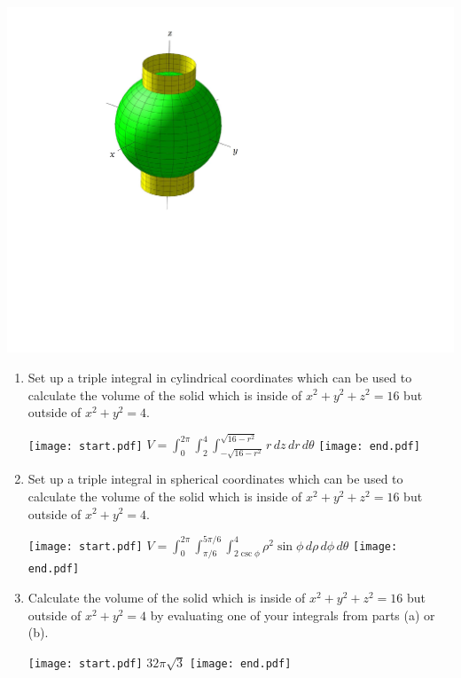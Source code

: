 \documentclass[12pt]{article}
\begin{document}
\begin{enumerate}
\begin{center}
\includegraphics[scale=0.5]{earth.pdf}
\end{center}

\begin{enumerate}

\item Set up a triple integral in cylindrical coordinates which can be used to calculate the volume of the solid which is inside of $x^2+y^2+z^2=16$ but outside of $x^2+y^2=4$.

\texttt{[image: start.pdf]}
{{$V=\int_0^{2\pi} \int_2^4 \int_{-\sqrt{16-r^2}}^{\sqrt{16-r^2}} r \,dz\,dr\,d\theta$}}
\texttt{[image: end.pdf]}


\item Set up a triple integral in spherical coordinates which can be used to calculate the volume of the solid which is inside of $x^2+y^2+z^2=16$ but outside of $x^2+y^2=4$.

\texttt{[image: start.pdf]}
{{$V=\int_0^{2\pi} \int_{\pi/6}^{5\pi/6} \int_{2\csc{\phi}}^4 \rho^2\sin{\phi} \,d\rho\,d\phi\,d\theta$}}
\texttt{[image: end.pdf]}


\item Calculate the volume of the solid which is inside of $x^2+y^2+z^2=16$ but outside of $x^2+y^2=4$ by evaluating one of your integrals from parts (a) or (b).

\texttt{[image: start.pdf]}
{{$32\pi\sqrt{3}$}}
\texttt{[image: end.pdf]}


\end{enumerate}


\end{enumerate}
\end{document}
